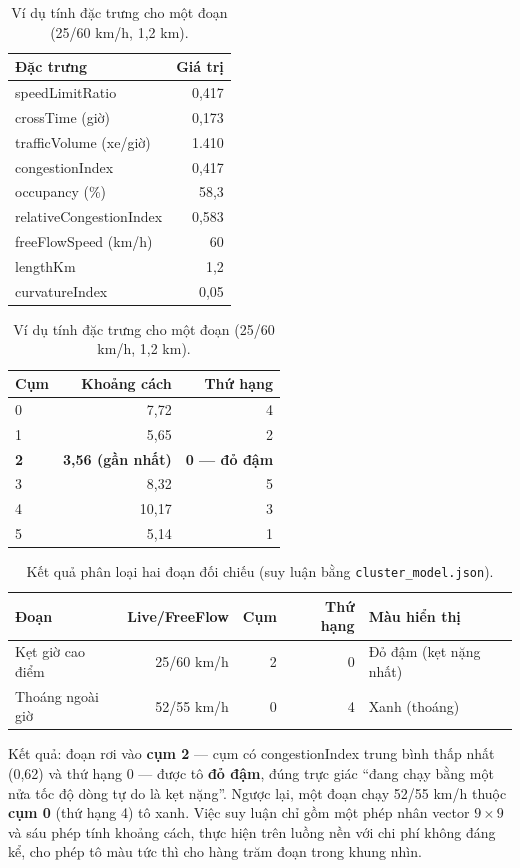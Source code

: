 \begin{table}[h!]
\centering
\caption{Ví dụ tính đặc trưng cho một đoạn (25/60 km/h, 1{,}2 km).}
\label{tab:walk1}
\small
\begin{tabular}{lr}
\toprule
\textbf{Đặc trưng} & \textbf{Giá trị}\\
\midrule
speedLimitRatio & 0{,}417\\
crossTime (giờ) & 0{,}173\\
trafficVolume (xe/giờ) & 1.410\\
congestionIndex & 0{,}417\\
occupancy (\%) & 58{,}3\\
relativeCongestionIndex & 0{,}583\\
freeFlowSpeed (km/h) & 60\\
lengthKm & 1{,}2\\
curvatureIndex & 0{,}05\\
\bottomrule
\end{tabular}
\hspace{8mm}
\begin{tabular}{lrr}
\toprule
\textbf{Cụm} & \textbf{Khoảng cách} & \textbf{Thứ hạng}\\
\midrule
0 & 7{,}72 & 4\\
1 & 5{,}65 & 2\\
\textbf{2} & \textbf{3{,}56 (gần nhất)} & \textbf{0 --- đỏ đậm}\\
3 & 8{,}32 & 5\\
4 & 10{,}17 & 3\\
5 & 5{,}14 & 1\\
\bottomrule
\end{tabular}
\end{table}

\begin{table}[h!]
\centering
\caption{Kết quả phân loại hai đoạn đối chiếu (suy luận bằng \texttt{cluster\_model.json}).}
\label{tab:walk2}
\small
\begin{tabular}{lrrrl}
\toprule
\textbf{Đoạn} & \textbf{Live/FreeFlow} & \textbf{Cụm} & \textbf{Thứ hạng} & \textbf{Màu hiển thị}\\
\midrule
Kẹt giờ cao điểm & 25/60 km/h & 2 & 0 & Đỏ đậm (kẹt nặng nhất)\\
Thoáng ngoài giờ & 52/55 km/h & 0 & 4 & Xanh (thoáng)\\
\bottomrule
\end{tabular}
\end{table}

Kết quả: đoạn rơi vào \textbf{cụm 2} --- cụm có congestionIndex trung bình thấp nhất (0{,}62) và thứ hạng 0 --- được tô \textbf{đỏ đậm}, đúng trực giác ``đang chạy bằng một nửa tốc độ dòng tự do là kẹt nặng''. Ngược lại, một đoạn chạy 52/55 km/h thuộc \textbf{cụm 0} (thứ hạng 4) tô xanh. Việc suy luận chỉ gồm một phép nhân vector $9\times9$ và sáu phép tính khoảng cách, thực hiện trên luồng nền với chi phí không đáng kể, cho phép tô màu tức thì cho hàng trăm đoạn trong khung nhìn.

